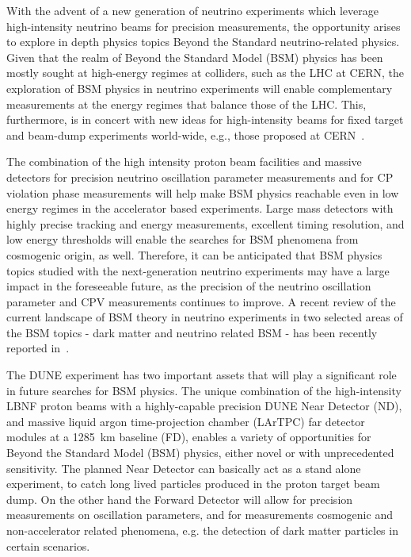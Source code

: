 
With the advent of a new generation of neutrino experiments which leverage high-intensity neutrino beams for precision measurements, 
the opportunity arises to explore in depth physics topics Beyond the Standard neutrino-related physics. 
Given that the realm of Beyond the Standard Model (BSM) physics  has been mostly sought at high-energy regimes at colliders, 
such as the LHC at CERN, the exploration of BSM physics in neutrino experiments will enable complementary 
measurements at the energy regimes that balance those  of the LHC. 
This, furthermore, is  in concert with new ideas for high-intensity beams for fixed target and beam-dump experiments 
world-wide, e.g., those proposed at CERN~\cite{Beacham:2019nyx}.

The combination of the high intensity proton beam facilities and massive detectors for precision neutrino oscillation parameter measurements and for CP violation phase measurements will help make BSM physics reachable even in low energy regimes in the accelerator based experiments.
Large mass detectors with highly precise tracking and energy measurements, excellent timing resolution, and low energy thresholds will enable the searches for BSM phenomena from cosmogenic origin, as well.
Therefore, it can be anticipated that BSM physics topics studied with the next-generation neutrino 
experiments may have a large impact in the foreseeable future, 
as the precision of the neutrino oscillation parameter and CPV measurements continues to improve.
A recent review of the current landscape of BSM theory in neutrino experiments in two selected areas of the BSM topics - dark matter and neutrino related BSM - has been recently reported in~\cite{Arguelles:2019xgp}.

The DUNE experiment has two important assets that will play a significant role in 
future searches for BSM physics.
The unique combination of the high-intensity LBNF proton beams with a highly-capable precision
 DUNE Near Detector (ND), and massive liquid argon time-projection chamber (LArTPC) far detector modules at a \SI{1285}{\km} baseline (FD), enables a variety of opportunities for Beyond the Standard Model (BSM) physics, either novel or with unprecedented sensitivity.
The planned Near Detector can basically act as a stand alone experiment,
to catch long lived particles produced in the proton target beam dump. On the other hand the Forward Detector
will allow for precision measurements on oscillation parameters, and for measurements cosmogenic and
 non-accelerator related phenomena, e.g. the detection of dark matter particles in certain scenarios.

